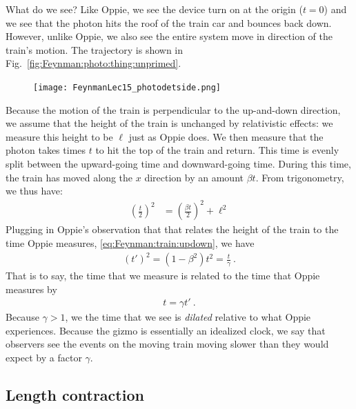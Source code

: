 \begin{subappendices}
What do we see? Like Oppie, we see the device turn on at the origin ($t=0$) and we see that the photon hits the roof of the train car and bounces back down. However, unlike Oppie, we also see the entire system move in direction of the train's motion. The trajectory is shown in Fig.~\ref{fig:Feynman:photo:thing:unprimed}.
\begin{figure}[ht]
\texttt{[image: FeynmanLec15\_photodetside.png]}
\end{figure}
Because the motion of the train is perpendicular to the up-and-down direction, we assume that the height of the train is unchanged by relativistic effects: we measure this height to be $\ell$ just as Oppie does. We then measure that the photon takes times $t$ to hit the top of the train and return. This time is evenly split between the upward-going time and downward-going time. During this time, the train has moved along the $x$ direction by an amount $\beta t$. From trigonometry, we thus have:
\begin{align}
    \left(\frac{t}{2}\right)^2
    &= 
    \left(\frac{\beta t}{2}\right)^2 + \ell^2
\end{align}
Plugging in Oppie's observation that that relates the height of the train to the time Oppie measures, \eqref{eq:Feynman:train:updown}, we have
\begin{align}
    (t')^2 = (1-\beta^2) t^2 =  \frac{t}{\gamma} \ .
\end{align}
That is to say, the time that we measure is related to the time that Oppie measures by
\begin{align}
    t = \gamma t' \ .
    \label{eq:time:dilation:derived}
\end{align}
Because $\gamma > 1$, we the time that we see is \emph{dilated} relative to what Oppie experiences. Because the gizmo is essentially an idealized clock, we say that observers see the events on the moving train moving  slower than they would expect by a factor $\gamma$. 




\subsection{Length contraction}


\end{subappendices}
